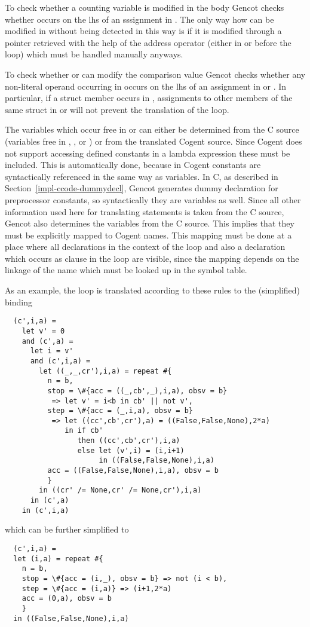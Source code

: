 To check whether a counting variable  is modified in the body  Gencot checks whether  occurs on the lhs
of an sssignment in . The only way how  can be modified in  without being detected in this way is if it 
is modified through a pointer retrieved with
the help of the address operator \code{\&} (either in  or before the loop) which must be handled manually anyways.

To check whether  or  can modify the comparison value  Gencot checks whether any non-literal operand 
occurring in  occurs on the lhs of an assignment in  or . In particular, if a struct member occurs 
in , assignments to other members of the same struct in  or  will not prevent the translation of the loop.

The variables  which occur free in  or  can either be determined from the C source (variables
free in , , or ) or from the translated Cogent source. Since Cogent does not support accessing defined
constants in a lambda expression these must be included. This is automatically done, because in Cogent constants are syntactically
referenced in the same way as variables. In C, as described in Section~\ref{impl-ccode-dummydecl}, Gencot generates dummy declaration
for preprocessor constants, so syntactically they are variables as well. Since all other information used here for translating 
 statements is taken from the C source, Gencot also determines the variables  from the C source. This implies
that they must be explicitly mapped to Cogent names. This mapping must be done at a place where all declarations in the context
of the loop and also a declaration which occurs as clause  in the loop are visible, since the mapping depends on the 
linkage of the name which must be looked up in the symbol table.

As an example, the loop  is translated according to these rules to the (simplified) binding
\begin{verbatim}
  (c',i,a) = 
    let v' = 0
    and (c',a) = 
      let i = v'
      and (c',i,a) =
        let ((_,_,cr'),i,a) = repeat #{
          n = b,
          stop = \#{acc = ((_,cb',_),i,a), obsv = b} 
           => let v' = i<b in cb' || not v',
          step = \#{acc = (_,i,a), obsv = b} 
           => let ((cc',cb',cr'),a) = ((False,False,None),2*a)
              in if cb' 
                 then ((cc',cb',cr'),i,a)
                 else let (v',i) = (i,i+1)
                      in ((False,False,None),i,a)
          acc = ((False,False,None),i,a), obsv = b
          }
        in ((cr' /= None,cr' /= None,cr'),i,a)
      in (c',a)
    in (c',i,a)
\end{verbatim}
which can be further simplified to
\begin{verbatim}
  (c',i,a) = 
  let (i,a) = repeat #{
    n = b,
    stop = \#{acc = (i,_), obsv = b} => not (i < b),
    step = \#{acc = (i,a)} => (i+1,2*a)
    acc = (0,a), obsv = b
    }
  in ((False,False,None),i,a)
\end{verbatim}

